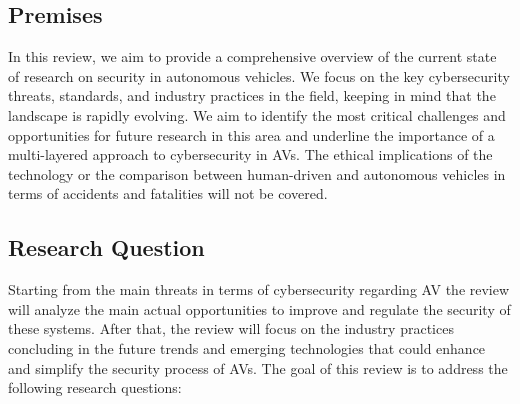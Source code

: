 \documentclass{scrartcl}
\begin{document}
    \subsection{Premises}\label{subsec:premises}

    In this review,
    we aim to provide a comprehensive overview of the current state of research on security in autonomous vehicles.
    We focus on the key cybersecurity threats, standards, and industry practices in the field,
    keeping in mind that the landscape is rapidly evolving.
    We aim to identify the most critical challenges and opportunities for future research in this area
    and underline the importance of a multi-layered approach to cybersecurity in AVs.
    The ethical implications of the technology or the comparison between human-driven and autonomous vehicles in terms of accidents and fatalities will not be covered.


    \subsection{Research Question}\label{subsec:research-question}

    Starting from the main threats in terms of cybersecurity regarding AV the review will analyze the main actual opportunities to improve and regulate the security of these systems.
    After that, the review will focus on the industry practices concluding in the future trends and emerging technologies that could enhance and simplify the security process of AVs.
    The goal of this review is to address the following research questions:
\end{document}
